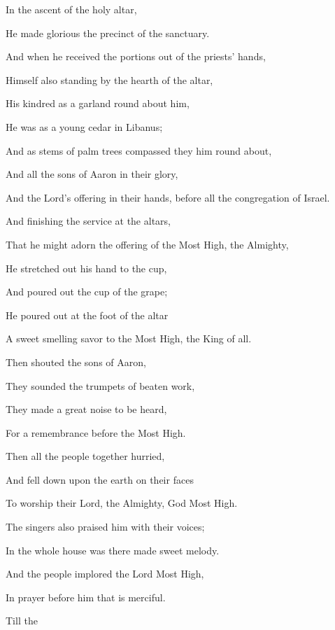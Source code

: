 {\par }{\Q In the ascent of the holy altar,
\par }{\Q He made glorious the precinct of the sanctuary.
\par }{\Q {}And when he received the portions out of the priests’ hands,
\par }{\Q Himself also standing by the hearth of the altar,
\par }{\Q His kindred as a garland round about him,
\par }{\Q He was as a young cedar in Libanus;
\par }{\Q And as stems of palm trees compassed they him round about,
\par }{\Q {}And all the sons of Aaron in their glory,
\par }{\Q And the Lord’s offering in their hands, before all the congregation of Israel.
\par }{\Q {}And finishing the service at the altars,
\par }{\Q That he might adorn the offering of the Most High, the Almighty,
\par }{\Q {}He stretched out his hand to the
 cup,
\par }{\Q And poured out the cup of the grape;
\par }{\Q He poured out at the foot of the altar
\par }{\Q A sweet smelling savor to the Most High, the King of all.
\par }{\Q {}Then shouted the sons of Aaron,
\par }{\Q They sounded the trumpets of beaten work,
\par }{\Q They made a great noise to be heard,
\par }{\Q For a remembrance before the Most High.
\par }{\Q {}Then all the people together hurried,
\par }{\Q And fell down upon the earth on their faces
\par }{\Q To worship their Lord, the Almighty, God Most High.
\par }{\Q {}The singers also praised him with their voices;
\par }{\Q In the whole house was there made sweet melody.
\par }{\Q {}And the people implored the Lord Most High,
\par }{\Q In prayer before him that is merciful.
\par }{\Q Till the
}
